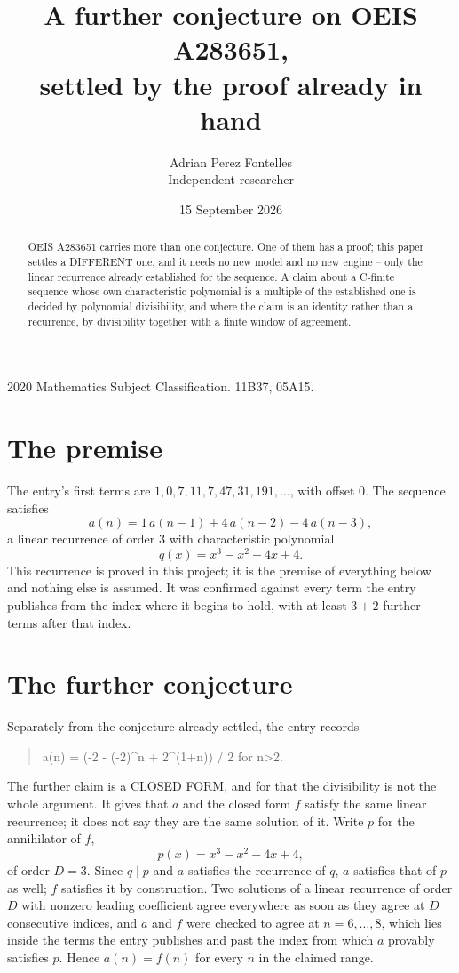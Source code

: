 \documentclass[11pt,a4paper]{article}
\title{A further conjecture on OEIS A283651,\\ \large settled by the proof already in hand}
\author{Adrian Perez Fontelles\\ \small Independent researcher}
\date{15 September 2026}
\theoremstyle{plain}
\theoremstyle{definition}
\begin{document}
\maketitle

\begin{abstract}
OEIS A283651 carries more than one conjecture. One of them has a proof; this paper settles a
DIFFERENT one, and it needs no new model and no new engine -- only the linear recurrence already
established for the sequence. A claim about a C-finite sequence whose own characteristic
polynomial is a multiple of the established one is decided by polynomial divisibility, and where
the claim is an identity rather than a recurrence, by divisibility together with a finite window
of agreement.
\end{abstract}

\noindent\small 2020 Mathematics Subject Classification. 11B37, 05A15.\normalsize

\section{The premise}

The entry's first terms are $1, 0, 7, 11, 7, 47, 31, 191,\dots$, with offset $0$. The sequence satisfies
\[
  a(n)=1\,a(n-1) + 4\,a(n-2) - 4\,a(n-3) ,
\]
a linear recurrence of order $3$ with characteristic polynomial
\[
  q(x)=x^{3} - x^{2} - 4 x + 4 .
\]
This recurrence is proved in this project; it is the premise of everything below and nothing else is assumed.
It was confirmed against every term the entry publishes from the index where it begins to hold,
with at least $3+2$ further terms after that index.

\section{The further conjecture}

Separately from the conjecture already settled, the entry records

\begin{quote}\raggedright a(n) = (-2 - (-2)\^{}n + 2\^{}(1+n)) / 2 for n>2.\end{quote}

The further claim is a CLOSED FORM, and for that the divisibility is not the whole argument. It
gives that $a$ and the closed form $f$ satisfy the same linear recurrence; it does not say they
are the same solution of it. Write $p$ for the annihilator of $f$,
\[
  p(x)=x^{3} - x^{2} - 4 x + 4 ,
\]
of order $D=3$. Since $q\mid p$ and $a$ satisfies the recurrence of $q$, $a$ satisfies that of
$p$ as well; $f$ satisfies it by construction. Two solutions of a linear recurrence of order $D$
with nonzero leading coefficient agree everywhere as soon as they agree at $D$ consecutive
indices, and $a$ and $f$ were checked to agree at $n=6,\dots,8$,
which lies inside the terms the entry publishes and past the index from which $a$ provably
satisfies $p$. Hence $a(n)=f(n)$ for every $n$ in the claimed range.
\end{document}
